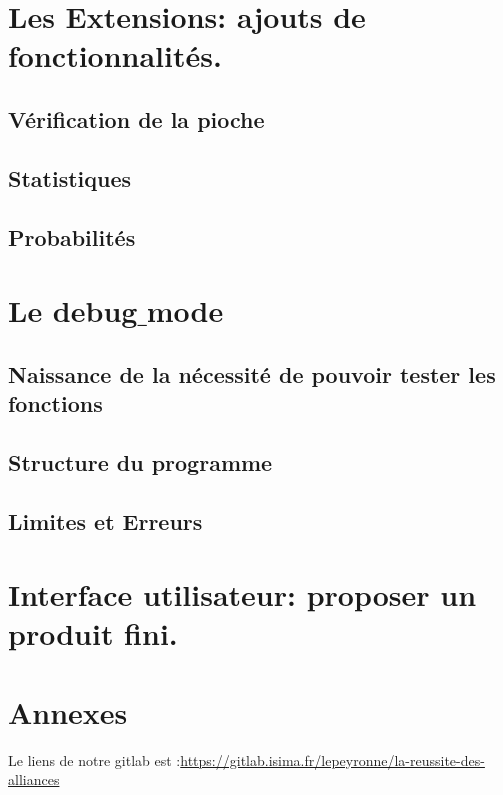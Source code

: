 \documentclass[10pt,a4paper,french,titlepage]{article}
\begin{document}
\section{Les Extensions: ajouts de fonctionnalités.}
\subsection{Vérification de la pioche}
\subsection{Statistiques}
\subsection{Probabilités}
\section{Le debug$\_$mode}
\subsection{Naissance de la nécessité de pouvoir tester les fonctions}
\subsection{Structure du programme}
\subsection{Limites et Erreurs}
\section{Interface utilisateur: proposer un produit fini.}
\section{Annexes}



Le liens de notre gitlab est :\url{https://gitlab.isima.fr/lepeyronne/la-reussite-des-alliances}
\end{document}

